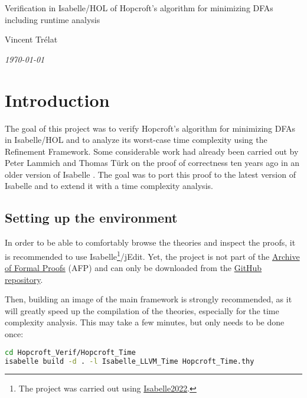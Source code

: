 \documentclass[12pt, a4 paper]{article}
\theoremstyle{definition}
\begin{document}
\begin{titlepage}
    \vspace*{4cm}
    \begin{center}
        \Large{Verification in Isabelle/HOL of Hopcroft's algorithm for minimizing DFAs including runtime analysis}
    \end{center}
    
    \vspace{2cm}
    
    \begin{center}
        Vincent Trélat
        
        \vspace{1cm}
        \textit{\today}
    \end{center}
    \vfill
\end{titlepage}

\tableofcontents

\pagebreak

\section{Introduction}
The goal of this project was to verify Hopcroft's algorithm for minimizing DFAs in Isabelle/HOL and to analyze its worst-case time complexity using the Refinement Framework.
Some considerable work had already been carried out by Peter Lammich and Thomas T\"urk on the proof of correctness ten years ago in an older version of Isabelle \cite{lammich:hop}.
The goal was to port this proof to the latest version of Isabelle and to extend it with a time complexity analysis.

\subsection{Setting up the environment}
In order to be able to comfortably browse the theories and inspect the proofs, it is recommended to use Isabelle\footnote{The project was carried out using \href{https://isabelle.in.tum.de/}{Isabelle2022}.}/jEdit. Yet, the project is not part of the \href{https://www.isa-afp.org/}{Archive of Formal Proofs} (AFP) and can only be downloaded from the \href{https://github.com/VTrelat/Hopcroft_Verif}{GitHub repository}.

Then, building an image of the main framework is strongly recommended, as it will greatly speed up the compilation of the theories, especially for the time complexity analysis. This may take a few minutes, but only needs to be done once:
\begin{lstlisting}[language=bash]
cd Hopcroft_Verif/Hopcroft_Time
isabelle build -d . -l Isabelle_LLVM_Time Hopcroft_Time.thy
\end{lstlisting}
\end{document}
